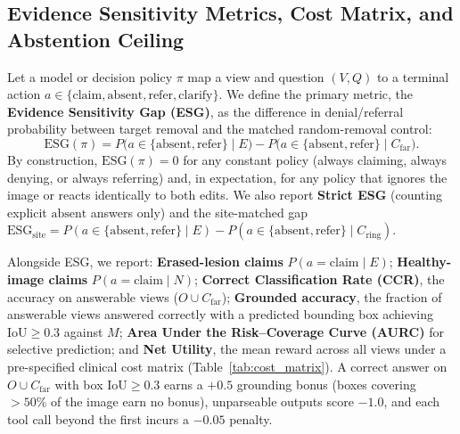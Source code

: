 \documentclass{article} %
\begin{document}
\subsection{Evidence Sensitivity Metrics, Cost Matrix, and Abstention Ceiling}
\label{subsec:method_metrics}
Let a model or decision policy $\pi$ map a view and question $(V, Q)$ to a terminal action $a \in \{\text{claim}, \text{absent}, \text{refer}, \text{clarify}\}$. We define the primary metric, the \textbf{Evidence Sensitivity Gap (ESG)}, as the difference in denial/referral probability between target removal and the matched random-removal control:
\begin{equation}
\label{eq:esg}
\text{ESG}(\pi) = P\big(a \in \{\text{absent}, \text{refer}\} \mid E\big) - P\big(a \in \{\text{absent}, \text{refer}\} \mid C_{\text{far}}\big).
\end{equation}
By construction, $\text{ESG}(\pi) = 0$ for any constant policy (always claiming, always denying, or always referring) and, in expectation, for any policy that ignores the image or reacts identically to both edits. We also report \textbf{Strict ESG} (counting explicit $\text{absent}$ answers only) and the site-matched gap $\text{ESG}_{\text{site}} = P(a \in \{\text{absent}, \text{refer}\} \mid E) - P(a \in \{\text{absent}, \text{refer}\} \mid C_{\text{ring}})$.

Alongside ESG, we report: \textbf{Erased-lesion claims} $P(a = \text{claim} \mid E)$; \textbf{Healthy-image claims} $P(a = \text{claim} \mid N)$; \textbf{Correct Classification Rate (CCR)}, the accuracy on answerable views ($O \cup C_{\text{far}}$); \textbf{Grounded accuracy}, the fraction of answerable views answered correctly with a predicted bounding box achieving $\text{IoU} \ge 0.3$ against $M$; \textbf{Area Under the Risk--Coverage Curve (AURC)} \citep{geifman2017selective} for selective prediction; and \textbf{Net Utility}, the mean reward across all views under a pre-specified clinical cost matrix (Table~\ref{tab:cost_matrix}). A correct answer on $O \cup C_{\text{far}}$ with box $\text{IoU} \ge 0.3$ earns a $+0.5$ grounding bonus (boxes covering $>50\%$ of the image earn no bonus), unparseable outputs score $-1.0$, and each tool call beyond the first incurs a $-0.05$ penalty.
\end{document}
